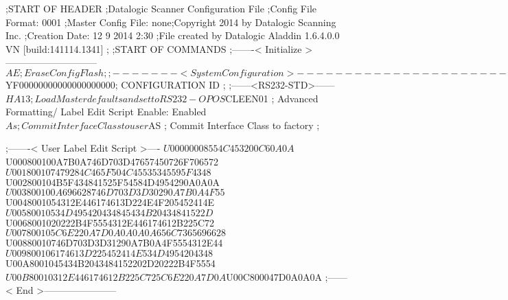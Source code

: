 ;START OF HEADER
;Datalogic Scanner Configuration File
;Config File Format: 0001
;Master Config File: none;Copyright 2014 by Datalogic Scanning Inc.
;Creation Date: 12 9 2014 2:30
;File created by Datalogic Aladdin 1.6.4.0.0 VN [build:141114.1341]
;
;START OF COMMANDS
;-------< Initialize >-----------------------------
$AE                 ; Erase Config Flash
;
;-------< System Configuration >-------------------------------
$YF00000000000000000000; CONFIGURATION ID
;
;------<RS232-STD>------
$HA13               ; Load Master defaults and set to RS232-OPOS
$CLEEN01            ; Advanced Formatting/ Label Edit Script Enable: Enabled
$As                 ; Commit Interface Class to user
$AS                 ; Commit Interface Class to factory
;

;-------< User Label Edit Script >----
$U00000008554C453200C60A0A
$U000800100A7B0A746D703D47657450726F706572
$U001800107479284C465F504C45535345595F4348
$U002800104B5F434841525F54584D4954290A0A0A
$U003800100A696628746D703D3D30290A7B0A4F55
$U0048001054312E446174613D224E4F205452414E
$U00580010534D495420434845434B20434841522D
$U0068001020222B4F5554312E446174612B225C72
$U007800105C6E220A7D0A0A0A0A656C7365696628
$U00880010746D703D3D31290A7B0A4F5554312E44
$U009800106174613D225452414E534D4954204348
$U00A8001045434B2043484152202D20222B4F5554
$U00B80010312E446174612B225C725C6E220A7D0A
$U00C800047D0A0A0A
;------< End >-----------------------
